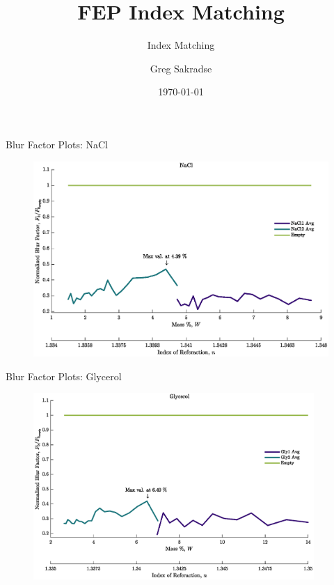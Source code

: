 \documentclass[10pt]{beamer}
\title{FEP Index Matching}
\subtitle{Index Matching}
\date{\today}
\author{Greg Sakradse}
\begin{document}
\begin{frame}{Blur Factor Plots: NaCl}
\begin{figure}
    \centering
    \includegraphics[width = 0.95 \textwidth]{NaCl_BlurPlot.eps}
    \label{NaClBlur}
\end{figure}
    
\end{frame}

\begin{frame}{Blur Factor Plots: Glycerol}
\begin{figure}
    \centering
    \includegraphics[width = 0.95\textwidth]{Gly_BlurPlot.eps}
    \label{GlyBlur}
\end{figure}
    
\end{frame}
\end{document}
